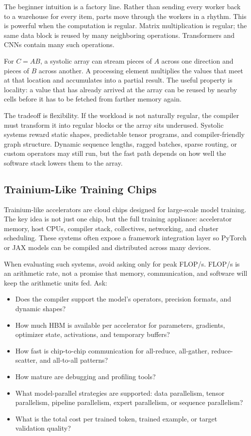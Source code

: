 The beginner intuition is a factory line. Rather than sending every worker back to a warehouse for every item, parts move through the workers in a rhythm. This is powerful when the computation is regular. Matrix multiplication is regular; the same data block is reused by many neighboring operations. Transformers and CNNs contain many such operations.

For \(C = AB\), a systolic array can stream pieces of \(A\) across one direction and pieces of \(B\) across another. A processing element multiplies the values that meet at that location and accumulates into a partial result. The useful property is locality: a value that has already arrived at the array can be reused by nearby cells before it has to be fetched from farther memory again.

The tradeoff is flexibility. If the workload is not naturally regular, the compiler must transform it into regular blocks or the array sits underused. Systolic systems reward static shapes, predictable tensor programs, and compiler-friendly graph structure. Dynamic sequence lengths, ragged batches, sparse routing, or custom operators may still run, but the fast path depends on how well the software stack lowers them to the array.

\subsection{Trainium-Like Training Chips}

Trainium-like accelerators are cloud chips designed for large-scale model training. The key idea is not just one chip, but the full training appliance: accelerator memory, host CPUs, compiler stack, collectives, networking, and cluster scheduling. These systems often expose a framework integration layer so PyTorch or JAX models can be compiled and distributed across many devices.

When evaluating such systems, avoid asking only for peak FLOP/s. FLOP/s is an arithmetic rate, not a promise that memory, communication, and software will keep the arithmetic units fed. Ask:

\begin{itemize}[leftmargin=*]
  \item Does the compiler support the model's operators, precision formats, and dynamic shapes?
  \item How much HBM is available per accelerator for parameters, gradients, optimizer state, activations, and temporary buffers?
  \item How fast is chip-to-chip communication for all-reduce, all-gather, reduce-scatter, and all-to-all patterns?
  \item How mature are debugging and profiling tools?
  \item What model-parallel strategies are supported: data parallelism, tensor parallelism, pipeline parallelism, expert parallelism, or sequence parallelism?
  \item What is the total cost per trained token, trained example, or target validation quality?
\end{itemize}

